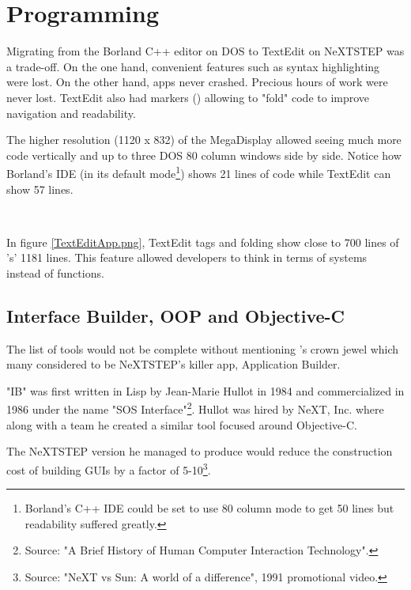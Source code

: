 \vspace{-10pt}
\section{Programming}
Migrating from the Borland C++ editor on DOS to TextEdit on NeXTSTEP was a trade-off. On the one hand, convenient features such as syntax highlighting were lost. On the other hand, apps never crashed. Precious hours of work were never lost. TextEdit also had markers (\cw{//}) allowing to "fold" code to improve navigation and readability.\\
\par
 The higher resolution (1120 x 832) of the MegaDisplay allowed seeing much more code vertically and up to three DOS 80 column windows side by side. Notice how Borland's IDE (in its default mode\footnote{Borland's C++ IDE could be set to use 80 column mode to get 50 lines but readability suffered greatly.}) shows 21 lines of code while TextEdit can show 57 lines.\\
\par
{}\\

\vspace{-4mm}


In figure \ref{TextEditApp.png}, TextEdit tags and folding show close to 700 lines of 's' 1181 lines. This feature allowed developers to think in terms of systems instead of functions.

\subsection{Interface Builder, OOP and Objective-C}
The list of tools would not be complete without mentioning \NeXT's crown jewel which many considered to be NeXTSTEP's killer app, Application Builder.\\
\par
"IB" was first written in Lisp by Jean-Marie Hullot in 1984 and commercialized in 1986 under the name "SOS Interface"\footnote{Source: "A Brief History of Human Computer Interaction Technology".}. Hullot was hired by NeXT, Inc. where along with a team he created a similar tool focused around Objective-C.\\
\par
The NeXTSTEP version he managed to produce would reduce the construction cost of building GUIs by a factor of 5-10\footnote{Source: "NeXT vs Sun: A world of a difference", 1991 promotional video.}.\\
\par
{}



